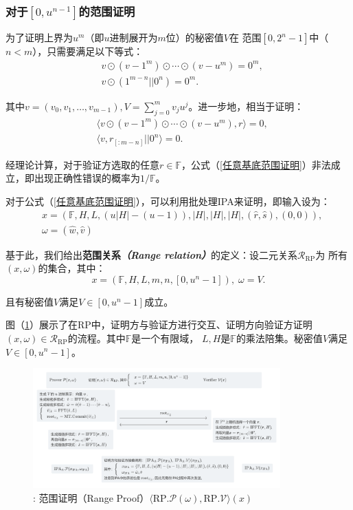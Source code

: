\documentclass[zihao=-4]{ctexart}
\begin{document}
\subsubsection{对于$[0,u^{n-1}]$的范围证明}
为了证明上界为$u^m$（即$u$进制展开为$m$位）的秘密值$V$在
范围$[0,2^n-1]$中（$n<m$），只需要满足以下等式：
\begin{equation}
  \begin{aligned}
    &v\odot(v-1^m)\odot\cdots\odot(v-u^m)=0^m,\\
    &v\odot(1^{m-n}||0^n)=0^m.
  \end{aligned}
\end{equation}\par
其中$v=(v_0,v_1,\ldots,v_{m-1}),V=\sum\limits_{j=0}^mv_ju^j$。进一步地，相当于证明：
\begin{equation}
  \begin{aligned}
    &\langle v\odot(v-1^m)\odot\cdots\odot(v-u^m),r\rangle=0,\\
    &\langle v,r_{[:m-n]}||0^n\rangle=0.
    \label{任意基底范围证明}
  \end{aligned}
\end{equation}\par
经理论计算，对于验证方选取的任意$r\in\mathbb{F}$，公式（\ref{任意基底范围证明}）非法成立，即出现正确性错误的概率为$1/\mathbb{F}$。\par
对于公式（\ref{任意基底范围证明}），可以利用批处理IPA来证明，即输入设为：
\begin{equation}
  \begin{aligned}
    &x=(\mathbb{F},H,L,(u|H|-(u-1)),|H|,|H|,|H|,(\hat{r},\hat{s}),(0,0)),\\
    &\omega=(\hat{w},\hat{v})
  \end{aligned}
\end{equation}\par
基于此，我们给出\textbf{范围关系\emph{（Range relation）}}的定义：设二元关系$\mathcal{R}_{\text{RP}}$为
所有$(x,\omega)$的集合，其中：
\[
  x=(\mathbb{F},H,L,m,n,[0,u^n-1]),\;\omega=V.
\]\par
且有秘密值$V$满足$V\in[0,u^n-1]$成立。\par
图（\ref{RP流程}）展示了在RP中，证明方与验证方进行交互、证明方向验证方证明
$(x,\omega)\in\mathcal{R}_{\text{RP}}$的流程。其中$\mathbb{F}$是一个有限域，
$L,H$是$\mathbb{F}$的乘法陪集。秘密值$V$满足$V\in[0,u^n-1]$。
\begin{figure}[H]
  \centering
  \includegraphics[width=0.85\textwidth]{./include_picture/RP.png}
  \caption{: 范围证明（Range Proof）$\langle \text{RP}.\mathcal{P}(\omega),\text{RP}.\mathcal{V}\rangle(x)$}
  \label{RP流程}
\end{figure}
\end{document}
